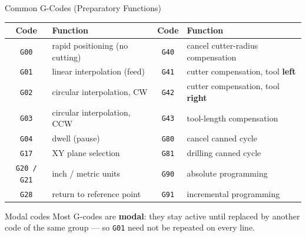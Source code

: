 \documentclass[aspectratio=169]{beamer}
\begin{document}
	\begin{frame}{Common G-Codes (Preparatory Functions)}
		\renewcommand{\arraystretch}{1.18}
		\centering
		\small
		\begin{tabular}{@{}cl@{\qquad}cl@{}}
			\toprule
			\textbf{Code} & \textbf{Function} & \textbf{Code} & \textbf{Function} \\
			\midrule
			\texttt{G00} & rapid positioning (no cutting)   & \texttt{G40} & cancel cutter-radius compensation \\
			\texttt{G01} & linear interpolation (feed)      & \texttt{G41} & cutter compensation, tool \textbf{left} \\
			\texttt{G02} & circular interpolation, CW       & \texttt{G42} & cutter compensation, tool \textbf{right} \\
			\texttt{G03} & circular interpolation, CCW      & \texttt{G43} & tool-length compensation \\
			\texttt{G04} & dwell (pause)                    & \texttt{G80} & cancel canned cycle \\
			\texttt{G17} & XY plane selection               & \texttt{G81} & drilling canned cycle \\
			\texttt{G20 / G21} & inch / metric units        & \texttt{G90} & absolute programming \\
			\texttt{G28} & return to reference point        & \texttt{G91} & incremental programming \\
			\bottomrule
		\end{tabular}
		\vspace{0.3cm}
		\begin{block}{Modal codes}
			\small Most G-codes are \textbf{modal}: they stay active until replaced by another code of the same group --- so \texttt{G01} need not be repeated on every line.
		\end{block}
	\end{frame}
\end{document}
